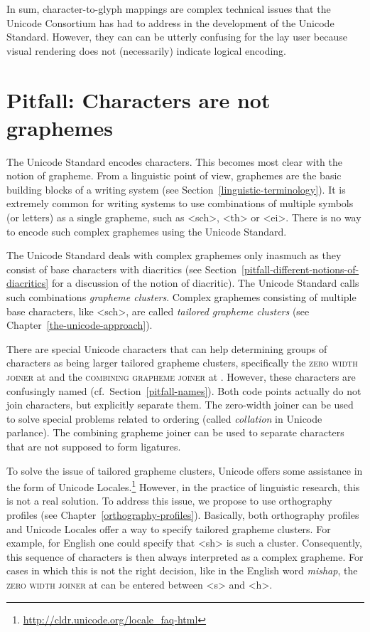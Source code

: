 In sum, character-to-glyph mappings are complex technical issues that the
Unicode Consortium has had to address in the development of the Unicode
Standard. However, they can can be utterly confusing for the lay user because visual
rendering does not (necessarily) indicate logical encoding.

\section{Pitfall: Characters are not graphemes}
\label{pitfall-characters-are-not-graphemes}

The Unicode Standard encodes characters. This becomes most clear with the notion of grapheme.
From a linguistic point of view, graphemes are the basic building blocks of a
writing system (see Section~\ref{linguistic-terminology}). It is extremely
common for writing systems to use 
combinations of multiple symbols (or letters) as a single grapheme, such as <sch>, <th> or <ei>.
There is no way to encode such complex graphemes using the Unicode Standard.

The Unicode Standard deals with complex graphemes only inasmuch as they consist of
base characters with diacritics (see
Section~\ref{pitfall-different-notions-of-diacritics} for a discussion of the
notion of diacritic). The Unicode Standard calls such combinations \textit{grapheme
clusters}. Complex graphemes consisting of multiple base characters,
like <sch>, are called \textit{tailored grapheme clusters} (see
Chapter~\ref{the-unicode-approach}).

There are special Unicode characters that 
can help determining groups of characters as being larger tailored grapheme clusters,
specifically the \textsc{zero width joiner} at  and the
\textsc{combining grapheme joiner} at . However, these characters are
confusingly named (cf.~Section~\ref{pitfall-names}). Both code points actually do
not join characters, but explicitly separate them. The zero-width joiner
can be used to solve special problems related to ordering (called \textit{collation}
in Unicode parlance). The combining grapheme joiner can be used to
separate characters that are not supposed to form ligatures. 

To solve the issue of tailored grapheme clusters, Unicode offers some assistance
in the form of Unicode Locales.\footnote{\url{http://cldr.unicode.org/locale_faq-html}} 
However, in the practice of
linguistic research, this is not a real solution. To address this issue, we propose to
use orthography profiles (see Chapter~\ref{orthography-profiles}). Basically,
both orthography profiles and Unicode Locales offer a way to specify
tailored grapheme clusters. For example, for English one could specify that <sh>
is such a cluster. Consequently, this sequence of characters is then always
interpreted as a complex grapheme. For cases in which this is not the right
decision, like in the English word \textit{mishap}, the \textsc{zero width
joiner} at  can be entered between <s> and <h>.

